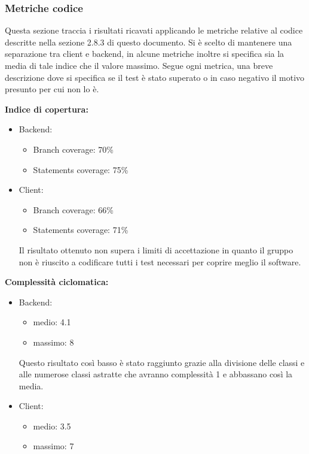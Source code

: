 		\subsubsection{Metriche codice}
			Questa sezione traccia i risultati ricavati applicando le metriche relative al codice descritte nella sezione 2.8.3 di questo documento. Si è scelto di mantenere una separazione tra client e backend, in alcune metriche inoltre si specifica sia la media di tale indice che il valore massimo. Segue ogni metrica, una breve descrizione dove si specifica se il test è stato superato o in caso negativo il motivo presunto per cui non lo è.\\
			\begin{description}
				\item \textbf{Indice di copertura:}				
				\begin{itemize}
						\item Backend:
							\begin{itemize}
								\item Branch coverage: 70\%
								\item Statements coverage: 75\%
							\end{itemize}
						\item Client:
							\begin{itemize}
								\item Branch coverage: 66\%
								\item Statements coverage: 71\%
							\end{itemize}
						Il risultato ottenuto non supera i limiti di accettazione in quanto il gruppo non è riuscito a codificare tutti i test necessari per coprire meglio il software.
					\end{itemize}
				
				\item \textbf{Complessità ciclomatica:}
					\begin{itemize}
						\item Backend:
							\begin{itemize}
								\item medio: 4.1
								\item massimo: 8
							\end{itemize}
						Questo risultato così basso è stato raggiunto grazie alla divisione delle classi e alle numerose classi astratte che avranno complessità 1 e abbassano così la media.
						\item Client:
							\begin{itemize}
								\item medio: 3.5
								\item massimo: 7
							\end{itemize}
					\end{itemize}
						

\end{description}
